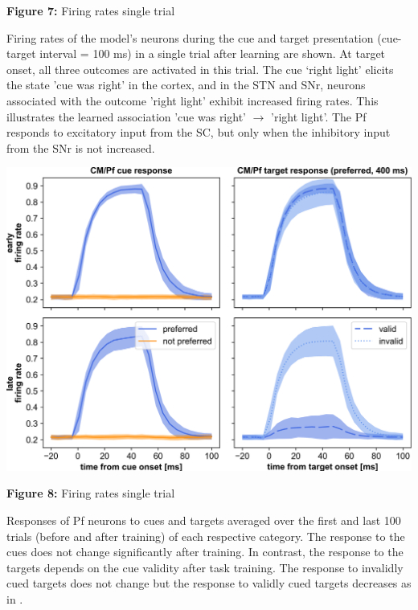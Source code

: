 \documentclass[portrait,final,a0paper,fontscale=0.30]{baposter}
\begin{document}
\begin{poster}
{\begin{adjustbox}{minipage=\textwidth, margin=2pt, center}
\begin{minipage}{0.26\textwidth}
        \textbf{Figure 7:} Firing rates single trial
	\end{minipage}
    \hspace{0.01\textwidth}
	\begin{minipage}{0.18\textwidth}
        Firing rates of the model’s neurons during the cue and target presentation (cue-target interval = 100 ms) in a single trial after learning are shown. At target onset, all three outcomes are activated in this trial. The cue ‘right light’ elicits the state 'cue was right' in the cortex, and in the STN and SNr, neurons associated with the outcome 'right light' exhibit increased firing rates. This illustrates the learned association 'cue was right' $\rightarrow$ 'right light'. The Pf responds to excitatory input from the SC, but only when the inhibitory input from the SNr is not increased.
	\end{minipage}
    \hspace{0.05\textwidth}
	\begin{minipage}{0.48\textwidth}  
        \begin{center}
            \includegraphics[width=0.75\linewidth]{figures/pf_response.png}
            
            \textbf{Figure 8:} Firing rates single trial \\
        \end{center}
        \vspace{5pt}
        Responses of Pf neurons to cues and targets averaged over the first and last 100 trials (before and after training) of each respective category. The response to the cues does not change significantly after training. In contrast, the response to the targets depends on the cue validity after task training. The response to invalidly cued targets does not change but the response to validly cued targets decreases as in \parencite{minamimoto_participation_2002}.
	\end{minipage}
    \hfill
  

\end{adjustbox}}
\end{poster}
\end{document}
